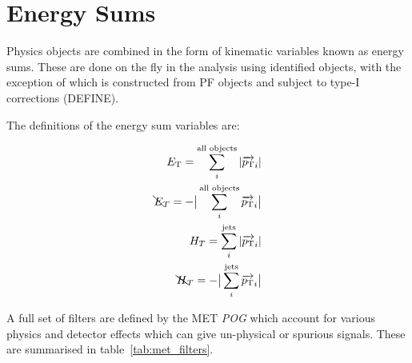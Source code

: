 \section{Energy Sums}  %
\label{sec:objects_energy_sums}
Physics objects are combined in the form of kinematic variables known as energy 
sums. These are done on the fly in the analysis using identified objects, with
the exception of \met which is constructed from PF objects and subject to type-I
corrections (DEFINE).

The definitions of the energy sum variables are:

\begin{equation}
    \begin{split}
    {E_{\text T}} = \sum_{i}^{\textrm{all objects}} |{\overrightarrow{p_{\text T}}}_i|\\
    \bcancel{E}_T = -\big|\sum_{i}^{\textrm{all objects}} {\overrightarrow{p_{\text T}}}_i\big|\\
    H_T = \sum_{i}^{\textrm{jets}} |{\overrightarrow{p_{\text T}}}_i|\\
    \bcancel{H}_T = -\big|\sum_{i}^{\textrm{jets}} {\overrightarrow{p_{\text T}}}_i\big|\\
    \end{split}
\label{eq:energy_sums}
\end{equation}

A full set of \met filters are defined by the MET \emph{POG} which account for various 
physics and detector effects which can give un-physical or spurious \met 
signals. These are summarised in table~\ref{tab:met_filters}.

